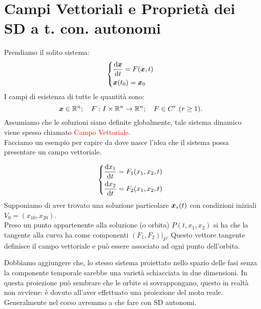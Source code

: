 \section{Campi Vettoriali e Proprietà dei SD a t. con. autonomi}%
\label{sub:Campi Vettoriali in SD a tempo continuo}
Prendiamo il solito sistema:
\[
    \begin{dcases}
	\frac{\text{d} \boldsymbol{x}}{\text{d} t} = F(\boldsymbol{x}, t)\\
	\boldsymbol{x} (t_0) = \boldsymbol{x}_0
    \end{dcases}
\] 
I campi di esistenza di tutte le quantità sono:
\[
    \boldsymbol{x}  \in \mathbb{R}^n; \quad F: I \times \mathbb{R}^n\to \mathbb{R}^n; \quad F \in C^r \ (r\ge 1)
.\] 
Assumiamo che le soluzioni siano definite globalmente, tale sistema dinamico viene spesso chiamato \textcolor{red}{Campo Vettoriale}.\\
Facciamo un esempio per capire da dove nasce l'idea che il sistema possa presentare un campo vettoriale.
\begin{exmp}
    \[
        \begin{dcases}
	    \frac{\text{d} x_1}{\text{d} t} =F_1(x_1,x_2,t)\\
	    \frac{\text{d} x_2}{\text{d} t} = F_2(x_1, x_2, t)
        \end{dcases}
    \] 
    Supponiamo di aver trovato una soluzione particolare $\boldsymbol{x}_s(t)$ con condizioni iniziali $V_0 = (x_{10}, x_{20})$.\\
    Preso un punto appartenente alla soluzione (o orbita) $P(t, x_1, x_2)$ si ha che la tangente alla curva ha come componenti $\left.(F_1, F_2)\right|_{P}$. Questo vettore tangente definisce il campo vettoriale e può essere associato ad ogni punto dell'orbita.
\end{exmp}
\noindent
Dobbiamo aggiungere che, lo stesso sistema proiettato nello spazio delle fasi senza la componente temporale sarebbe una varietà schiacciata in due dimensioni. In questa proiezione può sembrare che le orbite si sovrappongano, questo in realtà non avviene: è dovuto all'aver effettuato una proiezione del moto reale.\\
Generalmente nel corso avremmo a che fare con SD autonomi.
